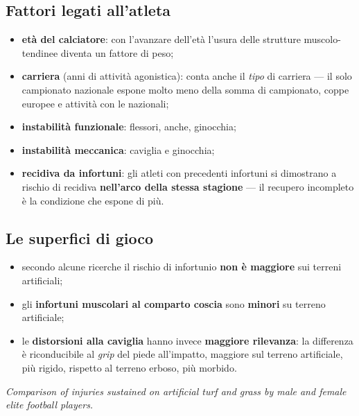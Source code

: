 \subsection{Fattori legati all'atleta}

\begin{itemize}
  \item \textbf{età del calciatore}: con l'avanzare dell'età l'usura delle strutture
    muscolo-tendinee diventa un fattore di peso;
  \item \textbf{carriera} (anni di attività agonistica): conta anche il \textit{tipo} di carriera
    --- il solo campionato nazionale espone molto meno della somma di campionato, coppe europee e
    attività con le nazionali;
  \item \textbf{instabilità funzionale}: flessori, anche, ginocchia;
  \item \textbf{instabilità meccanica}: caviglia e ginocchia;
  \item \textbf{recidiva da infortuni}: gli atleti con precedenti infortuni si dimostrano a rischio
    di recidiva \textbf{nell'arco della stessa stagione} --- il recupero incompleto è la condizione
    che espone di più.
\end{itemize}

\subsection{Le superfici di gioco}

\begin{itemize}
  \item secondo alcune ricerche il rischio di infortunio \textbf{non è maggiore} sui terreni
    artificiali;
  \item gli \textbf{infortuni muscolari al comparto coscia} sono \textbf{minori} su terreno
    artificiale;
  \item le \textbf{distorsioni alla caviglia} hanno invece \textbf{maggiore rilevanza}: la
    differenza è riconducibile al \textit{grip} del piede all'impatto, maggiore sul terreno
    artificiale, più rigido, rispetto al terreno erboso, più morbido.
\end{itemize}

\textit{Comparison of injuries sustained on artificial turf and grass by male and female elite
football players.}

